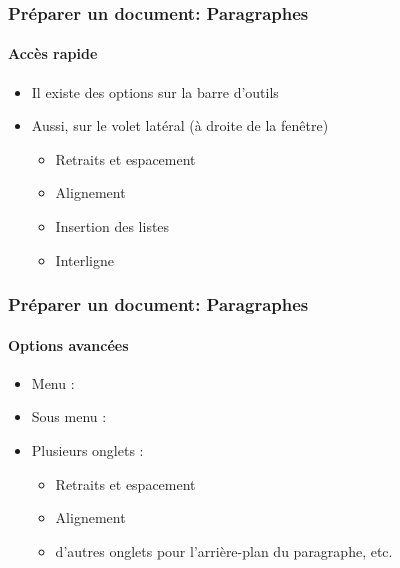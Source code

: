 \documentclass[xcolor=table]{beamer}
\begin{document}
\begin{frame}
\frametitle{Préparer un document: Paragraphes}
\framesubtitle{Accès rapide}

\begin{minipage}{0.64\textwidth}
	\begin{itemize}
		\item Il existe des options sur la barre d'outils
		\item Aussi, sur le volet latéral (à droite de la fenêtre)
		\begin{itemize}
			\item Retraits et espacement 
			\item Alignement
			\item Insertion des listes
			\item Interligne
		\end{itemize}
	\end{itemize}


\end{minipage}
\begin{minipage}{0.35\textwidth}
	
\end{minipage}

\end{frame}

\begin{frame}
\frametitle{Préparer un document: Paragraphes}
\framesubtitle{Options avancées}

\begin{minipage}{0.39\textwidth}
\begin{itemize}
	\item Menu :  
	\item Sous menu : 
	\item Plusieurs onglets : 
	\begin{itemize}
		\item Retraits et espacement 
		\item Alignement
		\item d'autres onglets pour l'arrière-plan du paragraphe, etc.
	\end{itemize}
\end{itemize}
\end{minipage}
\begin{minipage}{0.60\textwidth}
\end{minipage}

\end{frame}
\end{document}
